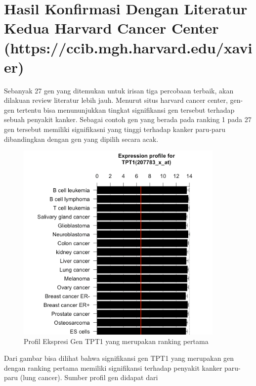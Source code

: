 \section{Hasil Konfirmasi Dengan Literatur Kedua Harvard Cancer Center (https://ccib.mgh.harvard.edu/xavier)}
Sebanyak 27 gen yang ditemukan untuk irisan tiga percobaan terbaik, akan dilakuan review literatur lebih jauh. Menurut situs harvard cancer center, gen-gen tertentu bisa menununjukkan tingkat signifikansi gen tersebut terhadap sebuah penyakit kanker. Sebagai contoh gen yang berada pada ranking 1 pada 27 gen tersebut memiliki signifikasni yang tinggi terhadap kanker paru-paru dibandingkan dengan gen yang dipilih secara acak.
\begin{figure}
	\centering
	\includegraphics[width=0.9\textwidth]
		{pics/tpt1.png}
	\caption{Profil Ekspresi Gen TPT1 yang merupakan ranking pertama}
	\label{fig:tpt1}
\end{figure}
Dari gambar bisa dilihat bahwa signifikansi gen TPT1 yang merupakan gen dengan ranking pertama memiliki signifikansi terhadap penyakit kanker paru-paru (lung cancer). Sumber profil gen didapat dari 

